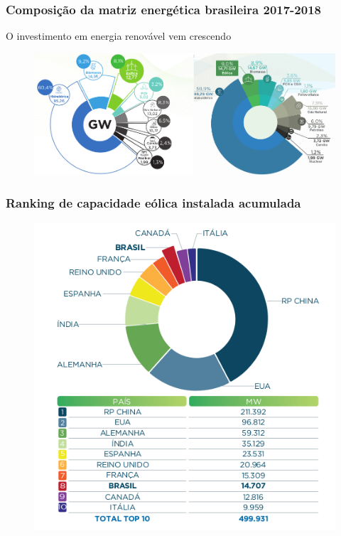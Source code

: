 \documentclass[mathserif,serif]{beamer}
\begin{document}
\begin{frame}
	\frametitle{Composição da matriz energética brasileira 2017-2018}
	O investimento em energia renovável vem crescendo
	\begin{figure}
		\centering
		\includegraphics[width=\textwidth]{abe_2017_2018}
	\end{figure}
\end{frame}

\begin{frame}
	\frametitle{Ranking de capacidade eólica instalada acumulada}
	\begin{figure}
		\centering
		\includegraphics[scale=0.4]{abe_maiores_produtores}
	\end{figure}
\end{frame}
\end{document}

